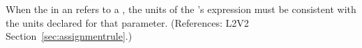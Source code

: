 When the  in an \InitialAssignment refers to a \Parameter,
the units of the \InitialAssignment's  expression must be
consistent with the units declared for that parameter.  (References: L2V2
Section~\ref{sec:assignmentrule}.)
